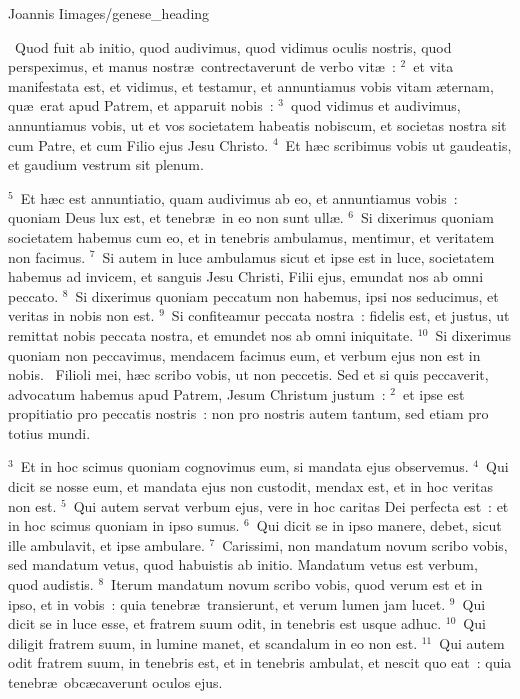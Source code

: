 {Joannis I}{images/genese_heading}

~\lettrine[lines=10,image=true,loversize=0.05,lraise=-0.03]{Q}{}uod fuit ab initio, quod audivimus, quod vidimus oculis nostris, quod perspeximus, et manus nostr\ae\ contrectaverunt de verbo vit\ae~:
${}^{2}$~et vita manifestata est, et vidimus, et testamur, et annuntiamus vobis vitam \ae ternam, qu\ae\ erat apud Patrem, et apparuit nobis~:
${}^{3}$~quod vidimus et audivimus, annuntiamus vobis, ut et vos societatem habeatis nobiscum, et societas nostra sit cum Patre, et cum Filio ejus Jesu Christo.
${}^{4}$~Et h\ae c scribimus vobis ut gaudeatis, et gaudium vestrum sit plenum.


${}^{5}$~Et h\ae c est annuntiatio, quam audivimus ab eo, et annuntiamus vobis~: quoniam Deus lux est, et tenebr\ae\ in eo non sunt ull\ae .
${}^{6}$~Si dixerimus quoniam societatem habemus cum eo, et in tenebris ambulamus, mentimur, et veritatem non facimus.
${}^{7}$~Si autem in luce ambulamus sicut et ipse est in luce, societatem habemus ad invicem, et sanguis Jesu Christi, Filii ejus, emundat nos ab omni peccato.
${}^{8}$~Si dixerimus quoniam peccatum non habemus, ipsi nos seducimus, et veritas in nobis non est.
${}^{9}$~Si confiteamur peccata nostra~: fidelis est, et justus, ut remittat nobis peccata nostra, et emundet nos ab omni iniquitate.
${}^{10}$~Si dixerimus quoniam non peccavimus, mendacem facimus eum, et verbum ejus non est in nobis.
~\lettrine[lines=10,image=true,loversize=0.05,lraise=-0.03]{F}{}ilioli mei, h\ae c scribo vobis, ut non peccetis. Sed et si quis peccaverit, advocatum habemus apud Patrem, Jesum Christum justum~:
${}^{2}$~et ipse est propitiatio pro peccatis nostris~: non pro nostris autem tantum, sed etiam pro totius mundi.


${}^{3}$~Et in hoc scimus quoniam cognovimus eum, si mandata ejus observemus.
${}^{4}$~Qui dicit se nosse eum, et mandata ejus non custodit, mendax est, et in hoc veritas non est.
${}^{5}$~Qui autem servat verbum ejus, vere in hoc caritas Dei perfecta est~: et in hoc scimus quoniam in ipso sumus.
${}^{6}$~Qui dicit se in ipso manere, debet, sicut ille ambulavit, et ipse ambulare.
${}^{7}$~Carissimi, non mandatum novum scribo vobis, sed mandatum vetus, quod habuistis ab initio. Mandatum vetus est verbum, quod audistis.
${}^{8}$~Iterum mandatum novum scribo vobis, quod verum est et in ipso, et in vobis~: quia tenebr\ae\ transierunt, et verum lumen jam lucet.
${}^{9}$~Qui dicit se in luce esse, et fratrem suum odit, in tenebris est usque adhuc.
${}^{10}$~Qui diligit fratrem suum, in lumine manet, et scandalum in eo non est.
${}^{11}$~Qui autem odit fratrem suum, in tenebris est, et in tenebris ambulat, et nescit quo eat~: quia tenebr\ae\ obc\ae caverunt oculos ejus.


